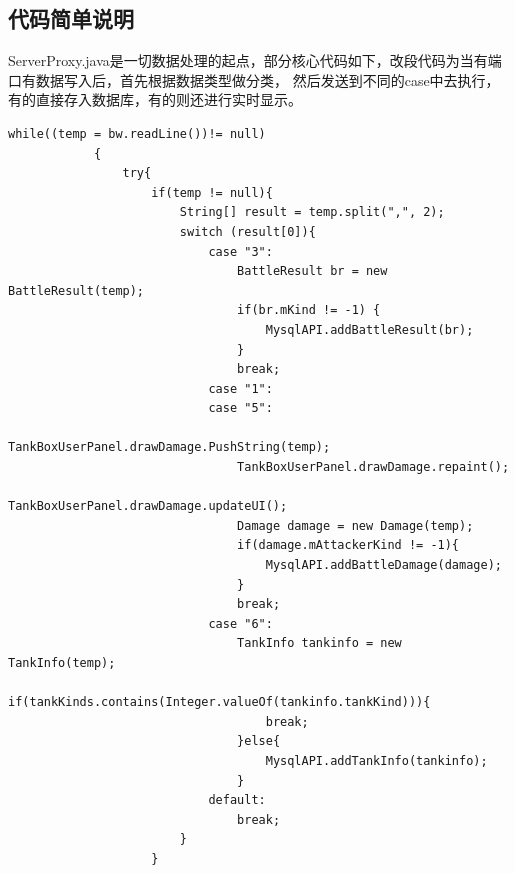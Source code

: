 \documentclass[UTF8, a4paper]{ctexart}
\begin{document}
\subsection{代码简单说明}

ServerProxy.java是一切数据处理的起点，部分核心代码如下，改段代码为当有端口有数据写入后，首先根据数据类型做分类，
然后发送到不同的case中去执行，有的直接存入数据库，有的则还进行实时显示。
\begin{lstlisting}[style=A]
  while((temp = bw.readLine())!= null)
            {
                try{
                    if(temp != null){
                        String[] result = temp.split(",", 2);
                        switch (result[0]){
                            case "3":
                                BattleResult br = new BattleResult(temp);
                                if(br.mKind != -1) {
                                    MysqlAPI.addBattleResult(br);
                                }
                                break;
                            case "1":
                            case "5":
                                TankBoxUserPanel.drawDamage.PushString(temp);
                                TankBoxUserPanel.drawDamage.repaint();
                                TankBoxUserPanel.drawDamage.updateUI();
                                Damage damage = new Damage(temp);
                                if(damage.mAttackerKind != -1){
                                    MysqlAPI.addBattleDamage(damage);
                                }
                                break;
                            case "6":
                                TankInfo tankinfo = new TankInfo(temp);
                                if(tankKinds.contains(Integer.valueOf(tankinfo.tankKind))){
                                    break;
                                }else{
                                    MysqlAPI.addTankInfo(tankinfo);
                                }
                            default:
                                break;
                        }
                    }
\end{lstlisting}
\end{document}
